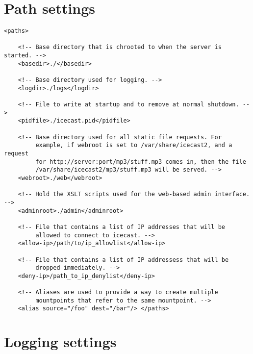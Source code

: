 
\section{Path settings}

\begin{lstlisting}
<paths>

    <!-- Base directory that is chrooted to when the server is started. -->
    <basedir>./</basedir>

    <!-- Base directory used for logging. --> 
    <logdir>./logs</logdir>

    <!-- File to write at startup and to remove at normal shutdown. -->
    <pidfile>./icecast.pid</pidfile>

    <!-- Base directory used for all static file requests. For
         example, if webroot is set to /var/share/icecast2, and a request
         for http://server:port/mp3/stuff.mp3 comes in, then the file
         /var/share/icecast2/mp3/stuff.mp3 will be served. -->
    <webroot>./web</webroot>

    <!-- Hold the XSLT scripts used for the web-based admin interface. -->
    <adminroot>./admin</adminroot>

    <!-- File that contains a list of IP addresses that will be
         allowed to connect to icecast. -->
    <allow-ip>/path/to/ip_allowlist</allow-ip>

    <!-- File that contains a list of IP addressess that will be
         dropped immediately. -->
    <deny-ip>/path_to_ip_denylist</deny-ip>

    <!-- Aliases are used to provide a way to create multiple
         mountpoints that refer to the same mountpoint. -->
    <alias source="/foo" dest="/bar"/> </paths>
\end{lstlisting}


\section{Logging settings}

